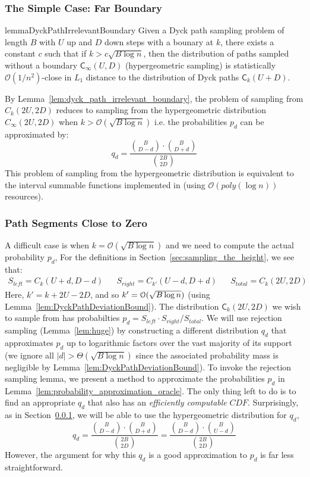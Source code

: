 \subsubsection{The Simple Case: Far Boundary}%
\label{sec:the_simple_case}
\begin{restatable}{lemma}{DyckPathIrrelevantBoundary}
\label{lem:dyck_path_irrelevant_boundary}
Given a Dyck path sampling problem of length $B$ with $U$ up and $D$ down steps with a bounary at $k$,
there exists a constant $c$ such that if $k > c \sqrt{B\log n}$, then the distribution of paths sampled without a boundary $\mathsf C_{\infty}(U,D)$
(hypergeometric sampling) is statistically $\mathcal O(1/n^2)$-close in $L_1$ distance to the distribution of Dyck paths $\mathsf C_k(U+D)$.
\end{restatable}
By Lemma~\ref{lem:dyck_path_irrelevant_boundary}, the problem of sampling from $C_k(2U,2D)$
reduces to sampling from the hypergeometric distribution $C_{\infty}(2U,2D)$ when $k>\mathcal{O}(\sqrt{B\log n})$
i.e. the probabilities $p_d$ can be approximated by:
$$
q_d = \frac{{{B}\choose{D-d}}\cdot{{B}\choose{D+d}}}{{{2B}\choose{2D}}}
$$
This problem of sampling from the hypergeometric distribution is equivalent to the interval summable functions
implemented in \cite{huge} (using $\mathcal O(poly(\log n))$ resources).

\subsubsection{Path Segments Close to Zero}
\label{sec:path_segments_close_to_zero}
A difficult case is when $k = \mathcal{O}(\sqrt{B\log n})$ and we need to compute the actual probability $p_d$,
For the definitions in Section~\ref{sec:sampling_the_height}, we see that:
\begin{align}
    S_{left} = C_k(U+d,D-d)
    &&S_{right} = C_{k'}(U-d,D+d)
    &&S_{total} = C_k(2U,2D)
\end{align}
Here, $k' = k+2U-2D$, and so $k' = \Bo(\sqrt{B\log n})$ (using Lemma~\ref{lem:DyckPathDeviationBound}).
The distribution $\mathsf C_k(2U,2D)$ we wish to sample from has probabilties $p_d = S_{left}\cdot S_{right}/S_{total}$.
We will use rejection sampling (Lemma~\ref{lem:huge}) by constructing a different distribution $q_d$
that approximates $p_d$ up to logarithmic factors over the vast majority of its support
(we ignore all $|d|>\Theta(\sqrt{B\log n})$ since the associated probability mass is negligible by Lemma~\ref{lem:DyckPathDeviationBound}).
To invoke the rejection sampling lemma, we present a method to approximate the probabilities $p_d$ in Lemma~\ref{lem:probability_approximation_oracle}.
The only thing left to do is to find an appropriate $q_d$ that also has an \emph{efficiently computable} $CDF$.
Surprisingly, as in Section~\ref{sec:the_simple_case}, we will be able to use the hypergeometric distribution for $q_d$,
$$
q_d = \frac{{B\choose D-d}\cdot{B\choose D+d}}{{2B\choose 2D}} = \frac{{B\choose D-d}\cdot{B\choose U-d}}{{2B\choose 2D}}
$$
However, the argument for why this $q_d$ is a good approximation to $p_d$ is far less straightforward.

